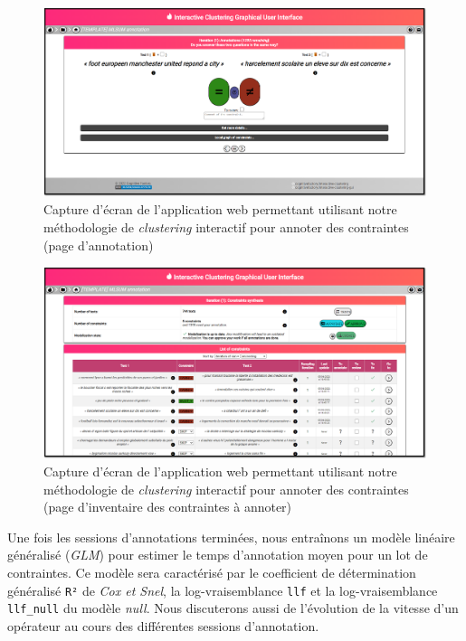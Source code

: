 			\begin{figure}[!htb]
				\centering
				\includegraphics[width=\textwidth]{figures/etude-temps-annotation-0application-annotation}
				\caption{Capture d'écran de l'application web permettant utilisant notre méthodologie de \textit{clustering} interactif pour annoter des contraintes (page d'annotation)}
				\label{figure:4.3.1-ETUDE-COUTS-TEMPS-ANNOTATION-APPLICATION-ANNOTATION}
			\end{figure}
			\begin{figure}[!htb]
				\centering
				\includegraphics[width=\textwidth]{figures/etude-temps-annotation-0application-liste-contraintes}
				\caption{Capture d'écran de l'application web permettant utilisant notre méthodologie de \textit{clustering} interactif pour annoter des contraintes (page d'inventaire des contraintes à annoter)}
				\label{figure:4.3.1-ETUDE-COUTS-TEMPS-ANNOTATION-APPLICATION-LISTE-CONTRAINTES}
			\end{figure}
			
			
			Une fois les sessions d'annotations terminées, nous entraînons un modèle linéaire généralisé (\textit{GLM}) pour estimer le temps d'annotation moyen pour un lot de contraintes. Ce modèle sera caractérisé par le coefficient de détermination généralisé \texttt{R²} de \textit{Cox et Snel}, la log-vraisemblance \texttt{llf} et la log-vraisemblance \texttt{llf\_null} du modèle \textit{null}.
			Nous discuterons aussi de l'évolution de la vitesse d'un opérateur au cours des différentes sessions d'annotation.

